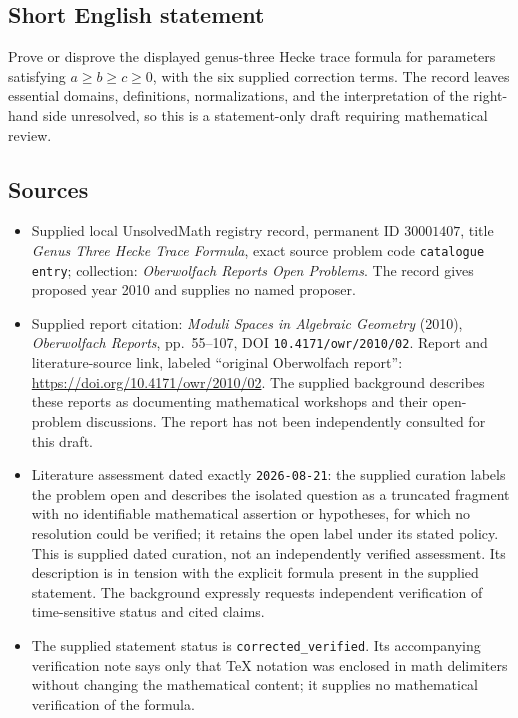 \documentclass[11pt]{article}
\begin{document}
\subsection{Short English statement}
Prove or disprove the displayed genus-three Hecke trace formula for parameters satisfying \(a\geq b\geq c\geq0\), with the six supplied correction terms. The record leaves essential domains, definitions, normalizations, and the interpretation of the right-hand side unresolved, so this is a statement-only draft requiring mathematical review.
\subsection{Sources}
\begin{itemize}
\item Supplied local UnsolvedMath registry record, permanent ID \(30001407\), title \emph{Genus Three Hecke Trace Formula}, exact source problem code \texttt{catalogue entry}; collection: \emph{Oberwolfach Reports Open Problems}. The record gives proposed year 2010 and supplies no named proposer.
\item Supplied report citation: \emph{Moduli Spaces in Algebraic Geometry} (2010), \emph{Oberwolfach Reports}, pp.~55--107, DOI \texttt{10.4171/owr/2010/02}. Report and literature-source link, labeled ``original Oberwolfach report'': \url{https://doi.org/10.4171/owr/2010/02}. The supplied background describes these reports as documenting mathematical workshops and their open-problem discussions. The report has not been independently consulted for this draft.
\item Literature assessment dated exactly \texttt{2026-08-21}: the supplied curation labels the problem open and describes the isolated question as a truncated fragment with no identifiable mathematical assertion or hypotheses, for which no resolution could be verified; it retains the open label under its stated policy. This is supplied dated curation, not an independently verified assessment. Its description is in tension with the explicit formula present in the supplied statement. The background expressly requests independent verification of time-sensitive status and cited claims.
\item The supplied statement status is \texttt{corrected\_verified}. Its accompanying verification note says only that TeX notation was enclosed in math delimiters without changing the mathematical content; it supplies no mathematical verification of the formula.
\end{itemize}
\end{document}
